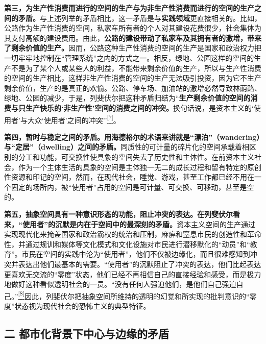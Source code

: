 \documentclass[UTF8, fontset = sourcesans, a4paper, oneside, zihao =
-4, scheme=chinese, no-math, space=true]{ctexbook}
\begin{document}
\textbf{第三，为生产性消费而进行的空间的生产与为非生产性消费而进行的空间的生产之间的矛盾。}与上述列举的矛盾相比，这一矛盾是与\textbf{实践领域}更直接相关的。比如，公路作为生产性消费的空间，私家车所有者的个人对其建设花费很少，社会集体为其支付高额的建设费用。由此，\textbf{公路的建设带动了私家车及其拥有者的激增，带来了剩余价值的生产。}因而，公路这种生产性消费的空间的生产是国家和政治权力把一切牢牢地控制在``管理系统''之内的方式之一。相反，绿地、公园这样的空间的生产不是为了某个人或某些人的利益，不能带来剩余价值的生产，所以与生产性消费的空间的生产相比，这样非生产性消费的空间的生产无法吸引投资，因为它不生产剩余价值，生产的是真正的欢愉。公路、停车场、加油站的激增必然导致林荫路、绿地、公园的减少，于是，列斐伏尔把这种矛盾归结为``\textbf{生产剩余价值的空间的消费与只生产快乐的`非生产性'空间的消费之间的冲突。}换句话说，是资本主义的`使用者'与大众`使用者'之间的冲突''\protect\hypertarget{part0008_split_001.htmlux5cux23w7}{}{}\protect\hyperlink{part0008_split_003.htmlux5cux23m7}{\textsuperscript{{[}7{]}}}。

\textbf{第四，暂时与稳定之间的矛盾。用海德格尔的术语来讲就是``漂泊''（wandering）与``定居''（dwelling）之间的矛盾。}同质性的可计量的碎片化的空间承载着相区别的分工和功能，可交换性使具象的空间失去了历史性和主体性。在前资本主义社会，作为一个主体生活的具象的空间是主体独一无二的成长过程和留有特定的原创性资源和印记的空间，然而，在现代社会，睡觉、游戏，甚至工作都已经不用在一个固定的场所内，被``使用者''占用的空间是可计量、可交换、可移动，甚至是空的。

\textbf{第五，抽象空间具有一种意识形态的功能，阻止冲突的表达。在列斐伏尔看来，``使用者''的沉默是内在于空间中的最深刻的矛盾。}资本主义空间的生产通过实现现代化来掩盖国家和政治霸权的统治和压制，麻痹和窒息市民的创造性和革命性，并通过规训和媒体等文化模式和文化设施对市民进行潜移默化的``动员''和``教育''。市民在空间的实践中沦为``使用者''，他们不仅被边缘化，而且很难感知到冲突并表达出他们最基本的需要。``使用者''的沉默阻止了冲突的表达，他们比起表达更喜欢无交流的``零度''状态，他们已经不再相信自己的直接经验和感受，而是极力地做好这种看似透明社会的一员。``没有任何人强迫他们，是他们自己强迫自己。''\protect\hypertarget{part0008_split_001.htmlux5cux23w8}{}{}\protect\hyperlink{part0008_split_003.htmlux5cux23m8}{\textsuperscript{{[}8{]}}}因此，列斐伏尔把抽象空间所维持的透明的幻觉和所实现的批判意识的``零度''状态视为现代社会的恐怖主义的典型特征。

\subsection{二
都市化背景下中心与边缘的矛盾}\label{part0008_split_001.htmlux5cux23c037}
\end{document}
